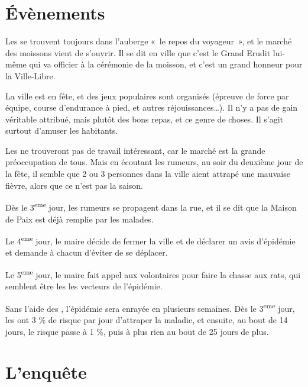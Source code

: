 \documentclass[a4paper,10pt,openany]{book}
\begin{document}
\begin{multicols}{2}

\section{Évènements}
Les \PJs se trouvent toujours dans l’auberge « le repos du voyageur », et le marché des moissons vient de s’ouvrir. Il se dit en ville que c’est le
Grand Erudit lui-même qui va officier à la cérémonie de la moisson, et c’est un grand honneur pour la Ville-Libre.\par La ville est en fête, et des
jeux populaires sont organisés (épreuve de force par équipe, course d’endurance à pied, et autres réjouissances\ldots). Il n’y a pas de gain véritable
attribué, mais plutôt des bons repas, et ce genre de choses. Il s’agit surtout d’amuser les habitants.\par Les \PJs ne trouveront pas de travail
intéressant, car le marché est la grande préoccupation de tous. Mais en écoutant les rumeurs, au soir du deuxième jour de la fête, il semble que 2 ou
3 personnes dans la ville aient attrapé une mauvaise fièvre, alors que ce n’est pas la saison.\par Dès le 3\textsuperscript{eme} jour, les rumeurs se
propagent dans la rue, et il se dit que la Maison de Paix est déjà remplie par les malades.\par Le 4\textsuperscript{eme} jour, le maire décide de
fermer la ville et de déclarer un avis d’épidémie et demande à chacun d’éviter de se déplacer.\par Le 5\textsuperscript{eme} jour, le maire fait appel
aux volontaires pour faire la chasse aux rats, qui semblent être les les vecteurs de l’épidémie.\par Sans l’aide des \PJs, l’épidémie sera enrayée en
plusieurs semaines. Dès le 3\textsuperscript{eme} jour, les \PJs ont 3 \% de risque par jour d’attraper la maladie, et ensuite, au bout de 14 jours,
le risque passe à 1 \%, puis à plus rien au bout de 25 jours de plus.

\section{L’enquête}

\end{multicols}
\end{document}
